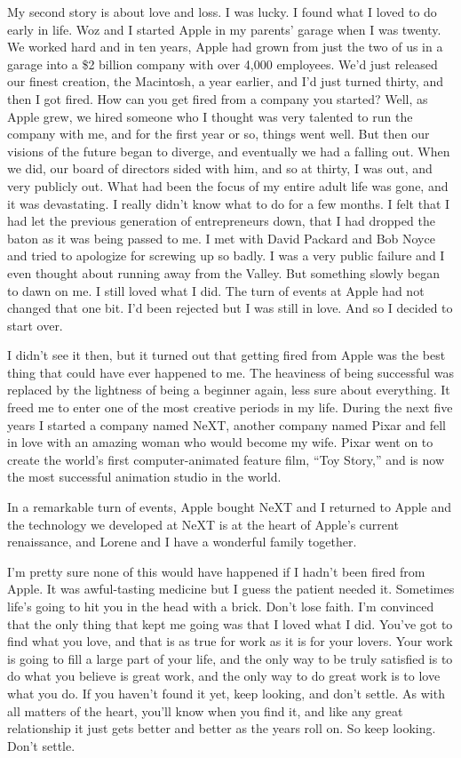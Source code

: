 \documentclass[12pt,a4paper,twocolumn]{article}
\begin{document}
My second story is about love and loss. I was lucky. I found what I loved to do early in life. Woz and I started Apple in my
parents' garage when I was twenty. We worked hard and in ten years, Apple had grown from just the two of us in a garage into
a \$2 billion company with over 4,000 employees. We'd just released our finest creation, the Macintosh, a year earlier, and
I'd just turned thirty, and then I got fired. How can you get fired from a company you started? Well, as Apple grew, we
hired someone who I thought was very talented to run the company with me, and for the first year or so, things went well.
But then our visions of the future began to diverge, and eventually we had a falling out. When we did, our board of
directors sided with him, and so at thirty, I was out, and very publicly out. What had been the focus of my entire adult
life was gone, and it was devastating. I really didn't know what to do for a few months. I felt that I had let the previous
generation of entrepreneurs down, that I had dropped the baton as it was being passed to me. I met with David Packard and
Bob Noyce and tried to apologize for screwing up so badly. I was a very public failure and I even thought about running away
from the Valley. But something slowly began to dawn on me. I still loved what I did. The turn of events at Apple had not
changed that one bit. I'd been rejected but I was still in love. And so I decided to start over.

I didn't see it then, but it turned out that getting fired from Apple was the best thing that could have ever happened to
me. The heaviness of being successful was replaced by the lightness of being a beginner again, less sure about everything.
It freed me to enter one of the most creative periods in my life. During the next five years I started a company named NeXT,
another company named Pixar and fell in love with an amazing woman who would become my wife. Pixar went on to create the
world's first computer-animated feature film, ``Toy Story,'' and is now the most successful animation studio in the world.

In a remarkable turn of events, Apple bought NeXT and I returned to Apple and the technology we developed at NeXT is at the
heart of Apple's current renaissance, and Lorene and I have a wonderful family together.

I'm pretty sure none of this would have happened if I hadn't been fired from Apple. It was awful-tasting medicine but I
guess the patient needed it. Sometimes life's going to hit you in the head with a brick. Don't lose faith. I'm convinced
that the only thing that kept me going was that I loved what I did. You've got to find what you love, and that is as true
for work as it is for your lovers. Your work is going to fill a large part of your life, and the only way to be truly
satisfied is to do what you believe is great work, and the only way to do great work is to love what you do. If you haven't
found it yet, keep looking, and don't settle. As with all matters of the heart, you'll know when you find it, and like any
great relationship it just gets better and better as the years roll on. So keep looking. Don't settle.
\end{document}
